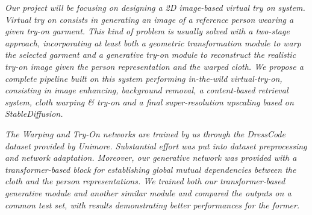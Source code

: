 \textit{Our project will be focusing on designing a 2D image-based virtual try on system. Virtual try on consists in generating an image of a reference person wearing a given try-on garment. This kind of problem is usually solved with a two-stage approach,  incorporating at least both a geometric transformation module to warp the selected garment and a generative try-on module to reconstruct the realistic try-on image given the person representation and the warped cloth.
We propose a complete pipeline built on this system performing in-the-wild virtual-try-on, consisting in image enhancing, background removal, a content-based retrieval system, cloth warping \& try-on and a final super-resolution upscaling based on StableDiffusion.}

\textit{The Warping and Try-On networks are trained by us through the DressCode dataset provided by Unimore. Substantial effort was put into dataset preprocessing and network adaptation. Moreover, our generative network was provided with a transformer-based block for establishing global mutual dependencies between the cloth and the person representations.
We trained both our transformer-based generative module and another similar module and compared the outputs on a common test set, with results demonstrating better performances for the former.}
